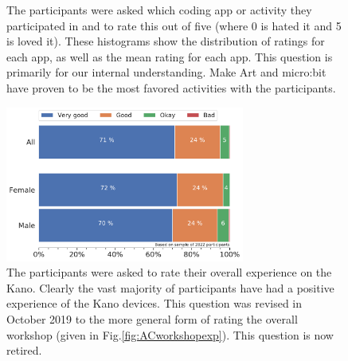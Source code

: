 \documentclass[12pt]{report} %
\begin{document}
\begin{figure}[!htb]
\caption{The participants were asked which coding app or activity they participated in and to rate this out of five (where 0 is hated it and 5 is loved it). These histograms show the distribution of ratings for each app, as well as the mean rating for each app. This question is primarily for our internal understanding. Make Art and micro:bit have proven to be the most favored activities with the participants. } 
\label{fig:appratings}
\end{figure}

\begin{figure}[t!]
    \centering
        \includegraphics[width=0.7\textwidth]{bar_kanoexp}
    \caption{\small The participants were asked to rate their overall experience on the Kano. Clearly the vast majority of participants have had a positive experience of the Kano devices. This question was revised in October 2019 to the more general form of rating the overall workshop (given in Fig.\ref{fig:ACworkshopexp}). This question is now retired.}
    \label{fig:kanoexp}
\end{figure}
\end{document}

